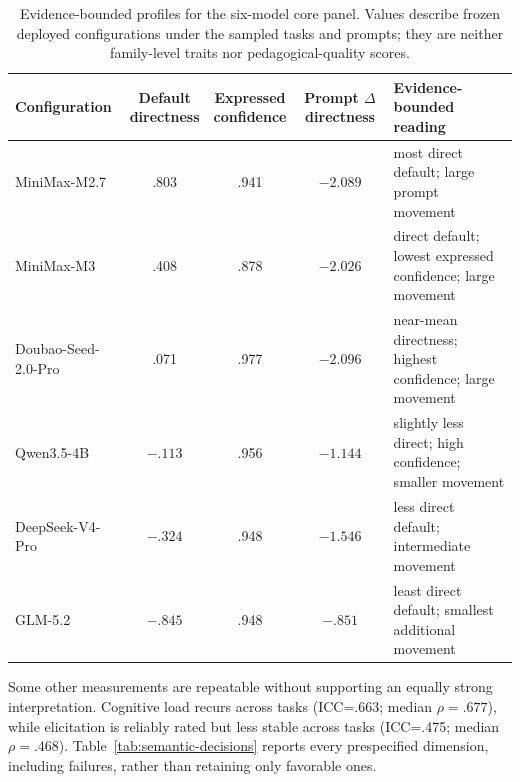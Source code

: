 \documentclass[11pt]{article}
\begin{document}
\begin{table}[t]
  \centering
  \scriptsize
  \setlength{\tabcolsep}{4pt}
  \begin{tabular}{lcccp{6.2cm}}
    \toprule
    \textbf{Configuration} & \shortstack{\textbf{Default}\\\textbf{directness}} & \shortstack{\textbf{Expressed}\\\textbf{confidence}} & \shortstack{\textbf{Prompt $\Delta$}\\\textbf{directness}} & \textbf{Evidence-bounded reading} \\
    \midrule
    MiniMax-M2.7 & .803 & .941 & $-2.089$ & most direct default; large prompt movement \\
    MiniMax-M3 & .408 & .878 & $-2.026$ & direct default; lowest expressed confidence; large movement \\
    Doubao-Seed-2.0-Pro & .071 & .977 & $-2.096$ & near-mean directness; highest confidence; large movement \\
    Qwen3.5-4B & $-.113$ & .956 & $-1.144$ & slightly less direct; high confidence; smaller movement \\
    DeepSeek-V4-Pro & $-.324$ & .948 & $-1.546$ & less direct default; intermediate movement \\
    GLM-5.2 & $-.845$ & .948 & $-.851$ & least direct default; smallest additional movement \\
    \bottomrule
  \end{tabular}
  \caption{Evidence-bounded profiles for the six-model core panel. Values
  describe frozen deployed configurations under the sampled tasks and prompts;
  they are neither family-level traits nor pedagogical-quality scores.}
  \label{tab:model-profiles}
\end{table}

Some other measurements are repeatable without supporting an equally strong
interpretation. Cognitive load recurs across tasks (ICC=.663; median
$\rho=.677$), while elicitation is reliably rated but less stable across tasks
(ICC=.475; median $\rho=.468$). Table~\ref{tab:semantic-decisions} reports every
prespecified dimension, including failures, rather than retaining only favorable
ones.
\end{document}
